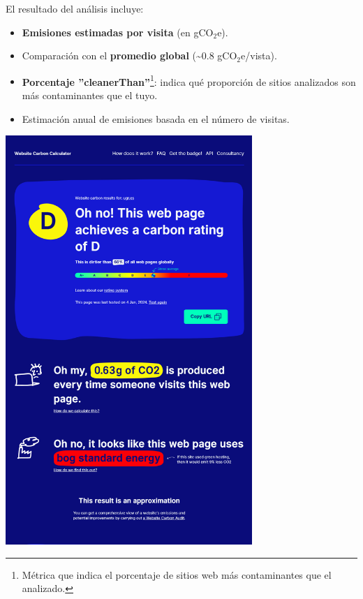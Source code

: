\documentclass[12pt,a4paper]{report}
\begin{document}
El resultado del análisis incluye:

\begin{itemize}
  \item \textbf{Emisiones estimadas por visita} (en gCO$_2$e).
  \item Comparación con el \textbf{promedio global} (\textasciitilde0.8
        gCO$_2$e/vista).
  \item \textbf{Porcentaje ''cleanerThan''}\footnote{Métrica que indica el porcentaje de sitios web más contaminantes que el analizado.}: indica qué proporción de sitios analizados son más contaminantes que el tuyo.
  \item Estimación anual de emisiones basada en el número de visitas.
\end{itemize}

\begin{center}
  \includegraphics[width=0.7\textwidth]{imagenes/WCC_2.png}
\end{center}
\end{document}
